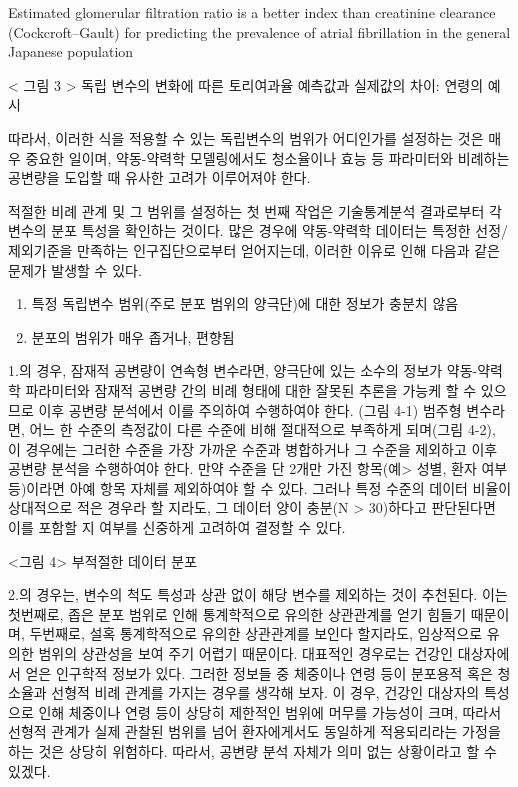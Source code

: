 \documentclass[
  10pt,
]{krantz}
\providecommand{\tightlist}{%
  \setlength{\itemsep}{0pt}\setlength{\parskip}{0pt}}
\begin{document}
Estimated glomerular filtration ratio is a better index than creatinine
clearance (Cockcroft--Gault) for predicting the prevalence of atrial
fibrillation in the general Japanese population

\textless{} 그림 3 \textgreater{} 독립 변수의 변화에 따른 토리여과율 예측값과 실제값의 차이: 연령의 예시

따라서, 이러한 식을 적용할 수 있는 독립변수의 범위가 어디인가를 설정하는 것은 매우 중요한 일이며, 약동-약력학 모델링에서도
청소율이나 효능 등 파라미터와 비례하는 공변량을 도입할 때 유사한 고려가 이루어져야 한다.

적절한 비례 관계 및 그 범위를 설정하는 첫 번째 작업은 기술통계분석 결과로부터 각 변수의 분포 특성을 확인하는 것이다. 많은
경우에 약동-약력학 데이터는 특정한 선정/제외기준을 만족하는 인구집단으로부터 얻어지는데, 이러한 이유로 인해 다음과 같은
문제가 발생할 수 있다.

\begin{enumerate}
\def\labelenumi{\arabic{enumi}.}
\tightlist
\item
  특정 독립변수 범위(주로 분포 범위의 양극단)에 대한 정보가 충분치 않음
\item
  분포의 범위가 매우 좁거나, 편향됨
\end{enumerate}

1.의 경우, 잠재적 공변량이 연속형 변수라면, 양극단에 있는 소수의 정보가 약동-약력학 파라미터와 잠재적 공변량 간의 비례
형태에 대한 잘못된 추론을 가능케 할 수 있으므로 이후 공변량 분석에서 이를 주의하여 수행하여야 한다. (그림 4-1)
범주형 변수라면, 어느 한 수준의 측정값이 다른 수준에 비해 절대적으로 부족하게 되며(그림 4-2), 이 경우에는 그러한 수준을
가장 가까운 수준과 병합하거나 그 수준을 제외하고 이후 공변량 분석을 수행하여야 한다. 만약 수준을 단 2개만 가진
항목(예\textgreater{} 성별, 환자 여부 등)이라면 아예 항목 자체를 제외하여야 할 수 있다. 그러나 특정 수준의 데이터 비율이
상대적으로 적은 경우라 할 지라도, 그 데이터 양이 충분(N \textgreater{} 30)하다고 판단된다면 이를 포함할 지 여부를 신중하게
고려하여 결정할 수 있다.

\textless 그림 4\textgreater{} 부적절한 데이터 분포

2.의 경우는, 변수의 척도 특성과 상관 없이 해당 변수를 제외하는 것이 추천된다. 이는 첫번째로, 좁은 분포 범위로 인해
통계학적으로 유의한 상관관계를 얻기 힘들기 때문이며, 두번째로, 설혹 통계학적으로 유의한 상관관계를 보인다
할지라도, 임상적으로 유의한 범위의 상관성을 보여 주기 어렵기 때문이다. 대표적인 경우로는 건강인 대상자에서 얻은
인구학적 정보가 있다. 그러한 정보들 중 체중이나 연령 등이 분포용적 혹은 청소율과 선형적 비례 관계를 가지는 경우를 생각해
보자. 이 경우, 건강인 대상자의 특성으로 인해 체중이나 연령 등이 상당히 제한적인 범위에 머무를 가능성이 크며, 따라서
선형적 관계가 실제 관찰된 범위를 넘어 환자에게서도 동일하게 적용되리라는 가정을 하는 것은 상당히 위험하다. 따라서,
공변량 분석 자체가 의미 없는 상황이라고 할 수 있겠다.
\end{document}
